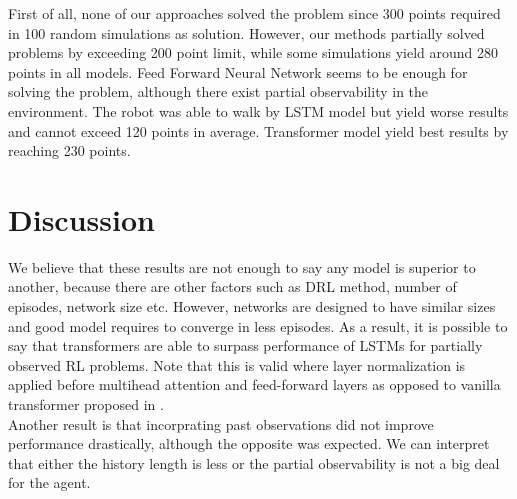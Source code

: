 First of all, none of our approaches solved the problem since 300 points required in 100 random simulations as solution. However, our methods partially solved problems by exceeding 200 point limit, while some simulations yield around 280 points in all models. Feed Forward Neural Network seems to be enough for solving the problem, although there exist partial observability in the environment. The robot was able to walk by LSTM model but yield worse results and cannot exceed 120 points in average. Transformer model yield best results by reaching 230 points.  \\
\section{Discussion}
We believe that these results are not enough to say any model is superior to another, because there are other factors such as DRL method, number of episodes, network size etc. However, networks are designed to have similar sizes and good model requires to converge in less episodes. As a result, it is possible to say that transformers are able to surpass performance of LSTMs for partially observed RL problems. Note that this is valid where layer normalization is applied before multihead attention and feed-forward layers \cite{xiong_layer_2020} as opposed to vanilla transformer proposed in \cite{vaswani_attention_2017}. \\
Another result is that incorprating past observations did not improve performance drastically, although the opposite was expected. We can interpret that either the history length is less or the partial observability is not a big deal for the agent. 